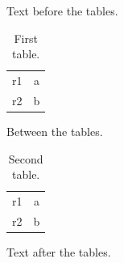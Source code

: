 \documentclass[12pt]{article}
\begin{document}
Text before the tables.

\begin{longtable}{lc}
\caption{First table.}\\
\hline
\endlastfoot
r1 & a\\
r2 & b\\
\end{longtable}

Between the tables.

\begin{longtable}{lc}
\caption{Second table.}\\
\hline
\endlastfoot
r1 & a\\
r2 & b\\
\end{longtable}

Text after the tables.
\end{document}

